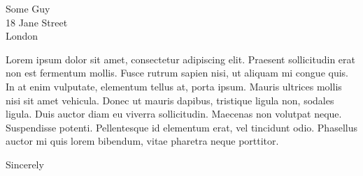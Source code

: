 \documentclass[version=last,11pt]{scrlttr2}
\begin{document}
\begin{letter}{Some Guy \\ 18 Jane Street \\ London}

\opening{}

 Lorem ipsum dolor sit amet, consectetur adipiscing elit. Praesent sollicitudin erat non est fermentum mollis. Fusce rutrum sapien nisi, ut aliquam mi congue quis. In at enim vulputate, elementum tellus at, porta ipsum. Mauris ultrices mollis nisi sit amet vehicula. Donec ut mauris dapibus, tristique ligula non, sodales ligula. Duis auctor diam eu viverra sollicitudin. Maecenas non volutpat neque. Suspendisse potenti. Pellentesque id elementum erat, vel tincidunt odio. Phasellus auctor mi quis lorem bibendum, vitae pharetra neque porttitor.
  \closing{Sincerely}

\end{letter}
\end{document}
